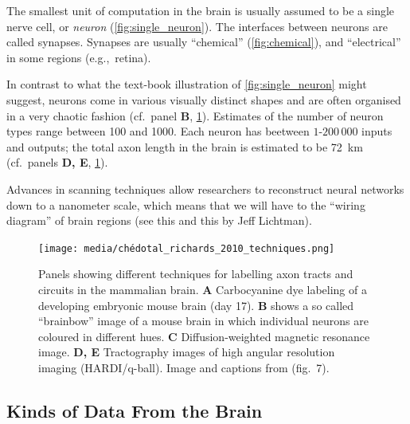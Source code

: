 \documentclass[10pt,letterpaper,oneside]{article}
\begin{document}
The smallest unit of computation in the brain is usually assumed to be a single nerve cell, or \emph{neuron} (\cref{fig:single_neuron}). The interfaces between neurons are called synapses. Synapses are usually \enquote{chemical} (\cref{fig:chemical}), and \enquote{electrical} in some regions (e.g.,~retina).

In contrast to what the text-book illustration of \cref{fig:single_neuron} might suggest, neurons come in various visually distinct shapes and are often organised in a very chaotic fashion (cf.~panel \textbf{B}, \cref{fig:neuron_techniques}). Estimates of the number of neuron types range between 100 and 1000. Each neuron has beetween $1$-$200\,000$ inputs and outputs; the total axon length in the brain is estimated to be \SI{72}{\kilo\meter} (cf.~panels \textbf{D, E}, \cref{fig:neuron_techniques}).

Advances in scanning techniques allow researchers to reconstruct neural networks down to a nanometer scale, which means that we will have to the \enquote{wiring diagram} of brain regions (see this  and this  by Jeff Lichtman).


\begin{figure}
	\centering
	\texttt{[image: media/chédotal\_richards\_2010\_techniques.png]}
	\caption{Panels showing different techniques for labelling axon tracts and circuits in the mammalian brain. \textbf{A} Carbocyanine dye labeling of a developing embryonic mouse brain (day 17). \textbf{B} shows a so called \enquote{brainbow} image of a mouse brain in which individual neurons are coloured in different hues. \textbf{C} Diffusion-weighted magnetic resonance image. \textbf{D, E} Tractography images of high angular resolution imaging (HARDI/q-ball).  Image and captions from \cite{chedotal2010wiring} (fig.~7).}
	\label{fig:neuron_techniques}
\end{figure}

\newpage

\subsection{Kinds of Data From the Brain}
\end{document}
